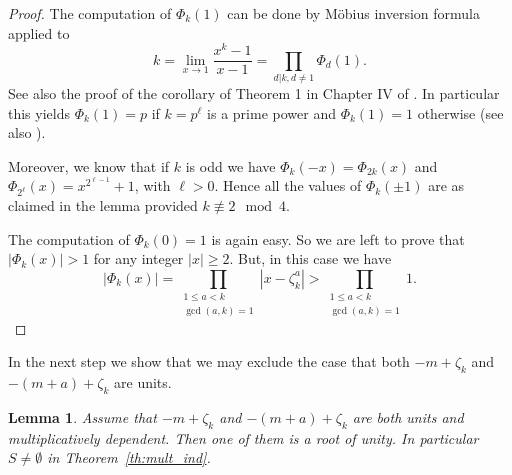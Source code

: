 \documentclass{amsart}
\theoremstyle{plain}
\numberwithin{equation}{section}
\newtheorem{lemma}[thm]{Lemma}
\theoremstyle{remark}
\begin{document}
\begin{proof}
  The computation of $\Phi_k(1)$ can be done
  by M{\"o}bius inversion formula applied to
  $$k=\lim_{x\rightarrow 1} \frac{x^k-1}{x-1} =\prod_{d|k,    d\neq 1} \Phi_d(1).$$
  See also the proof of the corollary of Theorem 1 in Chapter IV of
  \cite{Lang:ANT}. In particular this yields $\Phi_k(1)=p$ if $k=p^\ell$ is a
  prime power and $\Phi_k(1)=1$ otherwise (see also
  \cite[Proposition 3.5.4]{Cohen:NTI}).
  
  Moreover, we know that if $k$
  is odd we have $\Phi_k(-x)=\Phi_{2k}(x)$ and
  $\Phi_{2^\ell}(x)=x^{2^{\ell-1}}+1$, with $\ell>0$. Hence all the
  values of $\Phi_k(\pm 1)$ are as claimed in the lemma provided
  $k\not\equiv 2 \mod 4$.
  
  The computation of $\Phi_k(0)=1$ is again easy. So we are left to
  prove that $|\Phi_k(x)|> 1$ for any integer $|x|\geq 2$.  But, in
  this case we have
  $$|\Phi_k(x)|=\prod_{\substack{1 \leq a < k\\\gcd(a,k)=1}} |x-\zeta_k^a|> \prod_{\substack{1 \leq a <k\\ \gcd(a,k)=1}} 1.$$
\end{proof}

In the next step we show that we may exclude the case that both $-m+\zeta_k$ and $-(m+a)+\zeta_k$ are units.

\begin{lemma}\label{lem_not:units}
 Assume that $-m+\zeta_k$ and $-(m+a)+\zeta_k$ are both units and multiplicatively dependent. Then one of them is a root of unity. In particular $S\neq 
\emptyset$ in Theorem~\ref{th:mult_ind}.
\end{lemma}
\end{document}
